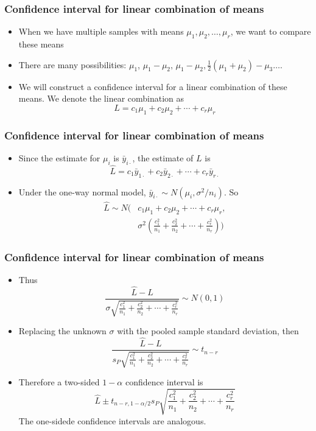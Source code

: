 \documentclass[handout]{beamer}\usepackage[]{graphicx}\usepackage[]{color}
\numberwithin{equation}{section}
\begin{document}
\begin{frame}
\frametitle{Confidence interval for linear combination of means}
\begin{itemize}
\item
When we have multiple samples with means $\mu_1, \mu_2, \ldots, \mu_r$, we want to compare these means
\item
There are many possibilities: $\mu_1$, $\mu_1 - \mu_2,\, \mu_1 - \mu_2, \frac{1}{2}(\mu_1 + \mu_2) - \mu_3 \ldots$.
\item
We will construct a confidence interval for a linear combination of these means. We denote the linear combination as
\[L = c_1 \mu_1 + c_2 \mu_2 + \cdots + c_r \mu_r\]
\end{itemize}
\end{frame}

\begin{frame}
\frametitle{Confidence interval for linear combination of means}
\begin{itemize}
\item
Since the estimate for $\mu_i$ is $\bar{y}_{i\cdot}$, the estimate of $L$ is 
\[\hat{L} = c_1 \bar{y}_{1\cdot} + c_2 \bar{y}_{2\cdot} + \cdots + c_r \bar{y}_{r\cdot}\]

\item
Under the one-way normal model, $\bar{y}_{i\cdot} \sim N(\mu_i, \sigma^2/n_i)$. So 
\begin{align*}
\hat{L} \sim N\bigg(&c_1 \mu_1 + c_2 \mu_2 + \cdots + c_r \mu_r,\\
&\sigma^2 \left(\frac{c_1^2}{n_1} + \frac{c_2^2}{n_2} + \cdots + \frac{c_r^2}{n_r}\right) \bigg)
\end{align*}
\end{itemize}
\end{frame}
\begin{frame}
\frametitle{Confidence interval for linear combination of means}
\begin{itemize}
\item
Thus
\[\frac{\hat{L} - L}{\sigma\sqrt{\frac{c_1^2}{n_1} + \frac{c_2^2}{n_2} + \cdots + \frac{c_r^2}{n_r}}} \sim N(0,1)\]
\item
Replacing the unknown $\sigma$ with the pooled sample standard deviation, then
\[\frac{\hat{L} - L}{s_P\sqrt{\frac{c_1^2}{n_1} + \frac{c_2^2}{n_2} + \cdots + \frac{c_r^2}{n_r}}} \sim t_{n-r}\]
\item 
Therefore a two-sided $1-\alpha$ confidence interval is
\[\hat{L} \pm t_{n-r, 1 - \alpha/2} s_P \sqrt{\frac{c_1^2}{n_1} + \frac{c_2^2}{n_2} + \cdots + \frac{c_r^2}{n_r}}\]
The one-sidede confidence intervals are analogous.
\end{itemize}
\end{frame}
\end{document}
